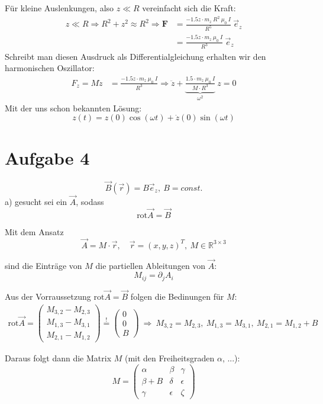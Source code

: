 \documentclass[11pt a4paper]{article}
\newcommand{\rot}{\text{rot}}
\begin{document}
Für kleine Auslenkungen, also $z \ll R$ vereinfacht sich die Kraft:
\begin{align*}
	z \ll R \Rightarrow R^2 + z^2 \approx R^2 \Rightarrow
	\mathbf F
	&= \frac{-1.5 z \cdot m_z \ R^2 \ \mu_0 \ I}
	{R^5} \ \vec e_z \\
	&= \frac{-1.5 z \cdot m_z \ \mu_0 \ I}
	{R^3} \ \vec e_z
\end{align*}
Schreibt man diesen Ausdruck als Differentialgleichung erhalten wir den
harmonischen Oszillator:
\begin{align*}
	F_z = M\ddot z 
	&= \frac{-1.5 z \cdot m_z \ \mu_0 \ I}
	{R^3} \Rightarrow
	\ddot z + \underbrace{\frac{1.5\cdot m_z \ \mu_0 \ I}{M \cdot R^3}}
	_{\omega^2} \ z = 0
\end{align*}
Mit der uns schon bekannten Lösung:
\[
	z(t) = z(0) \cos(\omega t) + \dot z(0) \sin(\omega t)
\]

\newpage
\section*{Aufgabe 4}
\[
	\vec B(\vec r) = B \vec e_z, \ B = const.
\]
a) gesucht sei ein $\vec A$, sodass
\[ \rot \vec A = \vec B \]

Mit dem Ansatz 
\[
	\vec A = M \cdot \vec r, \quad
	\vec r = (x,y,z)^T, \
	M \in \mathbb{R}^{3\times3}
\]

sind die Einträge von $M$ die partiellen Ableitungen von $\vec A$:
\[ M_{ij} = \partial_j A_i \]

Aus der Vorraussetzung $\rot \vec A =\vec B$ folgen die Bedinungen für 
$M$:
\begin{align*}
	\rot \vec A = \begin{pmatrix}
		M_{3,2} - M_{2,3} \\
		M_{1,3} - M_{3,1} \\
		M_{2,1} - M_{1,2} 
	\end{pmatrix}
	\overset{!}{=}
	\begin{pmatrix} 0 \\ 0 \\ B \end{pmatrix}
	\ \Rightarrow \
	M_{3,2} = M_{2,3}, \
	M_{1,3} = M_{3,1}, \
	M_{2,1} = M_{1,2} +B
\end{align*}

Daraus folgt dann die Matrix $M$ (mit den Freiheitsgraden $\alpha$, ...):
\[
	M = \begin{pmatrix}
		\alpha 		&\beta 		&\gamma \\
		\beta + B 	&\delta 	&\epsilon \\
		\gamma 		&\epsilon 	&\zeta
	\end{pmatrix}
\]
\end{document}
